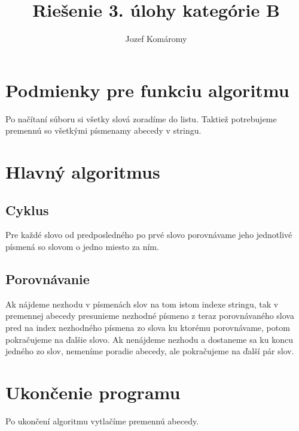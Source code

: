 \documentclass{article}
\begin{document}
\title{Riešenie 3. úlohy kategórie B}
\author{Jozef Komáromy}

\maketitle

\section{Podmienky pre funkciu algoritmu}

Po načítaní súboru si všetky slová zoradíme do listu.
Taktiež potrebujeme premennú so všetkými písmenamy abecedy v stringu.

\section{Hlavný algoritmus}
\subsection{Cyklus}
Pre každé slovo od predposledného po prvé slovo porovnávame jeho jednotlivé písmená so slovom o jedno miesto za ním.
\subsection{Porovnávanie}
Ak nájdeme nezhodu v písmenách slov na tom istom indexe stringu, tak v premennej abecedy presunieme nezhodné písmeno z teraz porovnávaného slova pred na index nezhodného písmena zo slova ku ktorému porovnávame, potom pokračujeme na ďalšie slovo.
Ak nenájdeme nezhodu a dostaneme sa ku koncu jedného zo slov, nemeníme poradie abecedy, ale pokračujeme na ďalší pár slov.

\section{Ukončenie programu}
Po ukončení algoritmu vytlačíme premennú abecedy.
\end{document}
